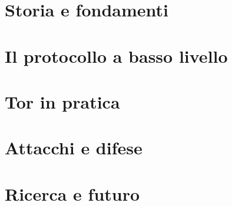 \part{Storia e fondamenti}




\part{Il protocollo a basso livello}












\part{Tor in pratica}









\part{Attacchi e difese}



\part{Ricerca e futuro}



\appendix




